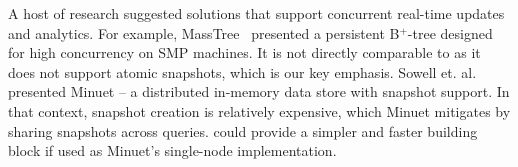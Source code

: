 A host of research suggested solutions that support concurrent real-time updates and analytics. 
For example, MassTree~\cite{Mao:2012} presented a persistent B$^{+}$-tree designed for high concurrency on SMP 
machines. It is not directly comparable to {\kiwi} as it does not support atomic snapshots, which is our key emphasis. 
Sowell et. al.~\cite{Sowell:2012} presented Minuet -- a distributed in-memory data store with snapshot support. 
In that context, snapshot creation is relatively expensive, which Minuet mitigates by sharing snapshots across queries. 
{\kiwi} could provide a simpler and faster building block if used as Minuet's single-node implementation. 



